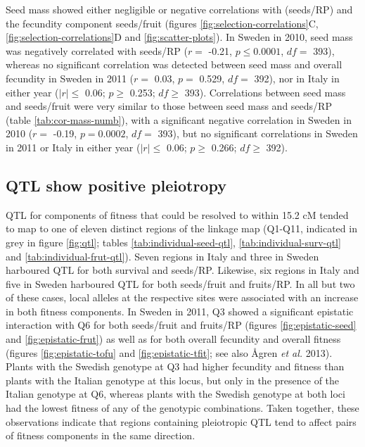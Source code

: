 \documentclass[]{article}
\begin{document}
Seed mass showed either negligible or negative correlations with (seeds/RP) and the fecundity component seeds/fruit (figures \ref{fig:selection-correlations}C, \ref{fig:selection-correlations}D and \ref{fig:scatter-plots}).
In Sweden in 2010, seed mass was negatively correlated with seeds/RP
(\(r=\) -0.21,
\(p \leq 0.0001\),
\(df=\) 393),
whereas no significant correlation was detected between seed mass and overall fecundity in Sweden in 2011
(\(r=\) 0.03,
\(p=\) 0.529,
\(df=\) 392),
nor in Italy in either year
(\(|r| \leq\) 0.06;
\(p \geq\) 0.253;
\(df \geq\)
393).
Correlations between seed mass and seeds/fruit were very similar to those between seed mass and seeds/RP (table \ref{tab:cor-mass-numb}), with a significant negative correlation in Sweden in 2010
(\(r=\) -0.19,
\(p = 0.0002\),
\(df=\) 393),
but no significant correlations in Sweden in 2011 or Italy in either year
(\(|r| \leq\) 0.06;
\(p \geq\) 0.266;
\(df \geq\)
392).

\hypertarget{qtl-show-positive-pleiotropy}{%
\subsection{QTL show positive pleiotropy}\label{qtl-show-positive-pleiotropy}}

QTL for components of fitness that could be resolved to within 15.2 cM tended to map to one of eleven distinct regions of the linkage map (Q1-Q11, indicated in grey in figure \ref{fig:qtl}; tables \ref{tab:individual-seed-qtl}, \ref{tab:individual-surv-qtl} and \ref{tab:individual-frut-qtl}).
Seven regions in Italy and three in Sweden harboured QTL for both survival and seeds/RP.
Likewise, six regions in Italy and five in Sweden harboured QTL for both seeds/fruit and fruits/RP. In all but two of these cases, local alleles at the respective sites were associated with an increase in both fitness components.
In Sweden in 2011, Q3 showed a significant epistatic interaction with Q6 for both seeds/fruit and fruits/RP (figures \ref{fig:epistatic-seed} and \ref{fig:epistatic-frut}) as well as for both overall fecundity and overall fitness (figures \ref{fig:epistatic-tofu} and \ref{fig:epistatic-tfit}; see also Ågren \emph{et al.} 2013). Plants with the Swedish genotype at Q3 had higher fecundity and fitness than plants with the Italian genotype at this locus, but only in the presence of the Italian genotype at Q6, whereas plants with the Swedish genotype at both loci had the lowest fitness of any of the genotypic combinations. Taken together, these observations indicate that regions containing pleiotropic QTL tend to affect pairs of fitness components in the same direction.
\end{document}
